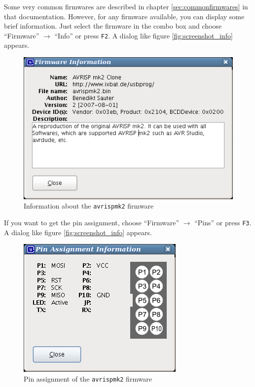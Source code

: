 \documentclass[bibtotoc,UKenglish,halfparskip,oneside,DIV12]{scrreprt}
\begin{document}
Some very common firmwares are described in chapter \vref{sec:commonfirmwares} in that
documentation. However, for any firmware available, you can display some brief information.
Just select the firmware in the combo box and choose ``Firmware'' $\rightarrow$ ``Info'' or press
\texttt{F2}. A dialog like figure \vref{fig:screenshot_info} appears.

\begin{figure}[hp]
  \centering
  \includegraphics[scale=0.5]{images/usbprog_info.png}
  \caption{Information about the \texttt{avrispmk2} firmware}
  \label{fig:screenshot_info}
\end{figure}

If you want to get the pin assignment, choose  ``Firmware'' $\rightarrow$ ``Pins''  or press
\texttt{F3}. A dialog like figure \vref{fig:screenshot_info} appears.


\begin{figure}[hp]
  \centering
  \includegraphics[scale=0.5]{images/usbprog_pin.png}
  \caption{Pin assignment of the \texttt{avrispmk2} firmware}
  \label{fig:screenshot_pin}
\end{figure}
\end{document}
